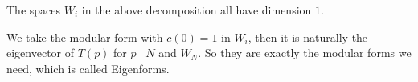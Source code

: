     \begin{theorem}
        The spaces  $W_{i}$  in the above decomposition all have dimension $1$.
    \end{theorem}

    We take the modular form with $c(0)=1$ in $W_{i}$, then it is  naturally the eigenvector of  $T(p)$  for  $p \mid N$  and  $W_{N}$. So they are exactly  the modular forms we need, which is called Eigenforms.